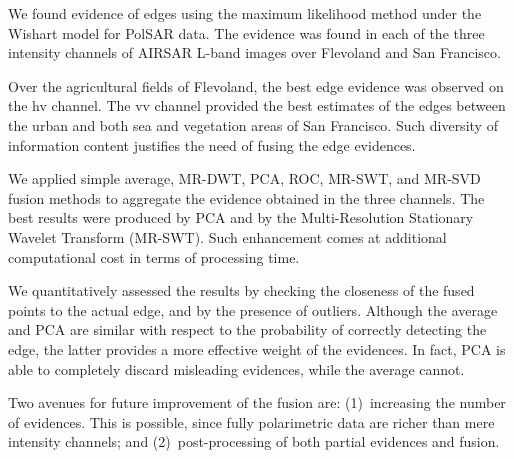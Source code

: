 \documentclass[journal]{IEEEtran}
\begin{document}
We found evidence of edges using the maximum likelihood method under the Wishart model for PolSAR data. 
The evidence was found in each of the three intensity channels of AIRSAR L-band images over Flevoland and San Francisco.

Over the agricultural fields of Flevoland, the best edge evidence was observed on the hv channel. 
The vv channel provided the best estimates of the edges between the urban and both sea and vegetation areas of San Francisco.
Such diversity of information content justifies the need of fusing the edge evidences.

We applied simple average, MR-DWT, PCA, ROC, MR-SWT, and MR-SVD fusion methods to aggregate the evidence obtained in the three channels.
The best results were produced by PCA and by the Multi-Resolution Stationary Wavelet Transform (MR-SWT).
Such enhancement comes at additional computational cost in terms of processing time.

We quantitatively assessed the results by checking the closeness of the fused points to the actual edge, and by the presence of outliers.
Although the average and PCA are similar with respect to the probability of correctly detecting the edge, the latter provides a more effective weight of the evidences.
In fact, PCA is able to completely discard misleading evidences, while the average cannot.


Two avenues for future improvement of the fusion are:
(1)~increasing the number of evidences.
	This is possible, since fully polarimetric data are richer than mere intensity channels; and
(2)~post-processing of both partial evidences and fusion.



\end{document}
